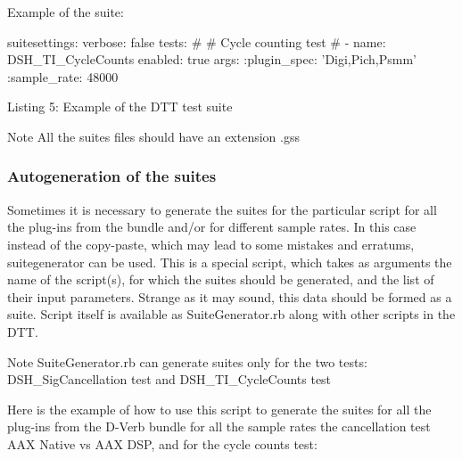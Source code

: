 Example of the suite\+: 
\begin{DoxyCode}
suitesettings:
  verbose: \textcolor{keyword}{false} 
tests: 
\textcolor{preprocessor}{#}
\textcolor{preprocessor}{# Cycle counting test}
\textcolor{preprocessor}{#}
- name: DSH\_TI\_CycleCounts 
  enabled: \textcolor{keyword}{true} 
  args: 
    :plugin\_spec: \textcolor{stringliteral}{'Digi,Pich,Psmm'} 
    :sample\_rate: 48000
\end{DoxyCode}
 Listing 5\+: Example of the D\+T\+T test suite

\begin{DoxyNote}{Note}
All the suites files should have an extension .gss
\end{DoxyNote}
\hypertarget{a00366_autogeneration_of_the_suites}{}\subsubsection{Autogeneration of the suites}\label{a00366_autogeneration_of_the_suites}
 Sometimes it is necessary to generate the suites for the particular script for all the plug-\/ins from the bundle and/or for different sample rates. In this case instead of the copy-\/paste, which may lead to some mistakes and erratums, suitegenerator can be used. This is a special script, which takes as arguments the name of the script(s), for which the suites should be generated, and the list of their input parameters. Strange as it may sound, this data should be formed as a suite. Script itself is available as Suite\+Generator.\+rb along with other scripts in the D\+T\+T.

\begin{DoxyNote}{Note}
Suite\+Generator.\+rb can generate suites only for the two tests\+: D\+S\+H\+\_\+\+Sig\+Cancellation test and D\+S\+H\+\_\+\+T\+I\+\_\+\+Cycle\+Counts test
\end{DoxyNote}
Here is the example of how to use this script to generate the suites for all the plug-\/ins from the \textquotesingle{}D-\/\+Verb\textquotesingle{} bundle for all the sample rates the cancellation test A\+A\+X Native vs A\+A\+X D\+S\+P, and for the cycle counts test\+:


